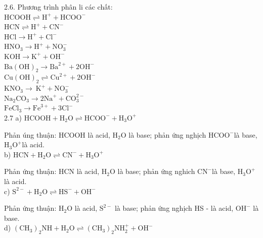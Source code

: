 \documentclass[10pt]{article}
\begin{document}
2.6. Phương trình phân li các chất:\\
$\mathrm{HCOOH} \rightleftharpoons \mathrm{H}^{+}+\mathrm{HCOO}^{-}$\\
$\mathrm{HCN} \rightleftharpoons \mathrm{H}^{+}+\mathrm{CN}^{-}$\\
$\mathrm{HCl} \longrightarrow \mathrm{H}^{+}+\mathrm{Cl}^{-}$\\
$\mathrm{HNO}_{3} \longrightarrow \mathrm{H}^{+}+\mathrm{NO}_{3}^{-}$\\
$\mathrm{KOH} \longrightarrow \mathrm{K}^{+}+\mathrm{OH}^{-}$\\
$\mathrm{Ba}(\mathrm{OH})_{2} \longrightarrow \mathrm{Ba}^{2+}+2 \mathrm{OH}^{-}$\\
$\mathrm{Cu}(\mathrm{OH})_{2} \rightleftharpoons \mathrm{Cu}^{2+}+2 \mathrm{OH}^{-}$\\
$\mathrm{KNO}_{3} \longrightarrow \mathrm{~K}^{+}+\mathrm{NO}_{3}^{-}$\\
$\mathrm{Na}_{2} \mathrm{CO}_{3} \longrightarrow 2 \mathrm{Na}^{+}+\mathrm{CO}_{3}^{2-}$\\
$\mathrm{FeCl}_{3} \longrightarrow \mathrm{Fe}^{3+}+3 \mathrm{Cl}^{-}$\\
2.7 a) $\mathrm{HCOOH}+\mathrm{H}_{2} \mathrm{O} \rightleftharpoons \mathrm{HCOO}^{-}+\mathrm{H}_{3} \mathrm{O}^{+}$

Phản úng thuận: HCOOH là acid, $\mathrm{H}_{2} \mathrm{O}$ là base; phản ứng nghịch $\mathrm{HCOO}^{-}$là base, $\mathrm{H}_{3} \mathrm{O}^{+}$là acid.\\
b) $\mathrm{HCN}+\mathrm{H}_{2} \mathrm{O} \rightleftharpoons \mathrm{CN}^{-}+\mathrm{H}_{3} \mathrm{O}^{+}$

Phản ứng thuận: HCN là acid, $\mathrm{H}_{2} \mathrm{O}$ là base; phản ứng nghich $\mathrm{CN}^{-}$là base, $\mathrm{H}_{3} \mathrm{O}^{+}$ là acid.\\
c) $\mathrm{S}^{2-}+\mathrm{H}_{2} \mathrm{O} \rightleftharpoons \mathrm{HS}^{-}+\mathrm{OH}^{-}$

Phản ứng thuận: $\mathrm{H}_{2} \mathrm{O}$ là acid, $\mathrm{S}^{2-}$ là base; phản ứng nghịch HS - là acid, $\mathrm{OH}^{-}$ là base.\\
d) $\left(\mathrm{CH}_{3}\right)_{2} \mathrm{NH}+\mathrm{H}_{2} \mathrm{O} \rightleftharpoons\left(\mathrm{CH}_{3}\right)_{2} \mathrm{NH}_{2}^{+}+\mathrm{OH}^{-}$
\end{document}
